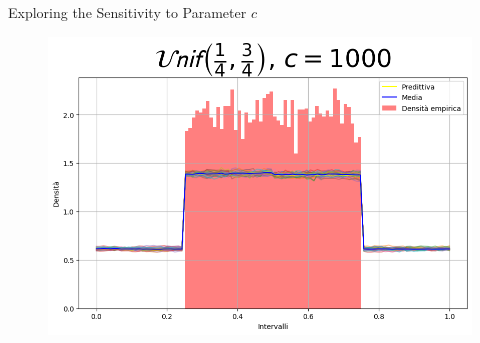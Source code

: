 \documentclass{beamer}
\begin{document}
\begin{frame}{Exploring the Sensitivity to Parameter \(c\)}
\begin{figure}
\begin{minipage}{0.32\textwidth}
        \end{minipage}
        \hfill
        \begin{minipage}{0.32\textwidth}
            \centering
            \includegraphics[width=\textwidth]{Unifc1000.png}
        \end{minipage}
    \end{figure}
    \caption{\(Unif(1/4,3/4)\)}


\end{frame}
\end{document}
